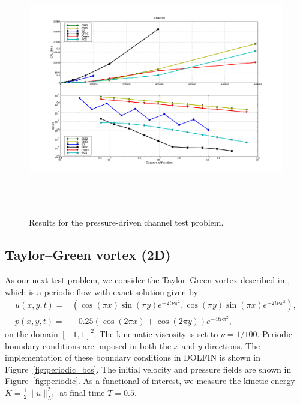 \begin{figure}
  \includegraphics[width=20cm,height=11cm,keepaspectratio=false]{chapters/kvs-1/pdf/new_channel_res.pdf}
  \caption{Results for the pressure-driven channel test problem.}
  \label{fig:channel_results}
\end{figure}

\subsection{Taylor--Green vortex (2D)}

As our next test problem, we consider the Taylor--Green vortex
described in \citet{CanutoHussainiQuarteroniEtAl2007}, which is a
periodic flow with exact solution given by
\begin{equation}\label{eq:periodic}
  \begin{split}
    u(x,y,t) = & (\cos (\pi x) \sin (\pi y)  e^{-2t\nu\pi^2}, \cos (\pi y)  \sin (\pi x)  e^{-2t\nu\pi^2}), \\
    p(x,y,t) = & -0.25(\cos(2\pi x ) + \cos(2\pi y ))  e^{-4t\nu\pi^2},
  \end{split}
\end{equation}
on the domain $[-1, 1]^{2}$. The kinematic viscosity is set to $\nu =
1/100$. Periodic boundary conditions are imposed in both the $x$ and
$y$ directions. The implementation of these boundary conditions in
DOLFIN is shown in Figure~\ref{fig:periodic_bcs}. The initial velocity
and pressure fields are shown in Figure~\ref{fig:periodic}. As a
functional of interest, we measure the kinetic energy $K = \frac{1}{2}
\|u\|^2_{L^2}$ at final time $T = 0.5$.

